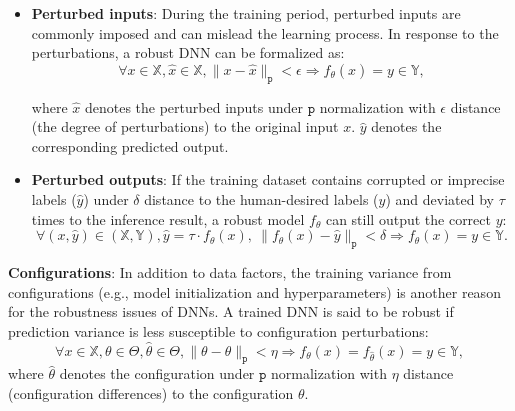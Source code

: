 \begin{itemize}[leftmargin=.2in] 

    \item \textbf{Perturbed inputs}: During the training period, perturbed inputs are commonly imposed and can mislead the learning process. In response to the perturbations, a robust DNN can be formalized as:
    \begin{equation}\label{eq1}
    \forall x\in \mathbb{X}, \hat{x}\in \mathbb{X}, \|x-\hat{x}\|_\mathtt{p} < \epsilon \Rightarrow {f_{\theta}(\hat{x})}=y\in \mathbb{Y},
    \end{equation}

where $\hat{x}$ denotes the perturbed inputs under $\mathtt{p}$ normalization with $\epsilon$ distance (the degree of perturbations) to the original input $x$. $\hat{y}$ denotes the corresponding predicted output. 


    \item \textbf{Perturbed outputs}: If the training dataset contains corrupted or imprecise labels ($\hat{y}$) under $\delta$ distance to the human-desired labels ($y$) and deviated by $\tau$ times to the inference result, a robust model $f_{\theta}$ can still output the correct $y$:
    \begin{equation} \label{eq3} 
    \forall (x, \hat{y})\in( \mathbb{X}, \mathbb{Y}), \hat{y} = \tau \cdot f_{\theta}(x), \  \|f_{\theta}(x)-\hat{y}\|_\mathtt{p} < \delta  \Rightarrow f_{\theta}(x) = y\in \mathbb{Y}.
    \end{equation}
\end{itemize}

\item{\textbf{Configurations}:} In addition to data factors, the training variance from configurations (e.g., model initialization and hyperparameters) is another reason for the robustness issues of DNNs. A trained DNN is said to be robust if prediction variance is less susceptible to configuration perturbations:
    \begin{equation}\label{eq4}  
   \forall  x\in \mathbb{X}, \theta \in \Theta, \hat{\theta} \in \Theta, \|\theta-\hat{\theta}\|_\mathtt{p} < \eta \Rightarrow f_{\theta}(x)=f_{\hat{\theta}}(x)=y\in \mathbb{Y},
    \end{equation}
where $\hat{\theta}$ denotes the configuration under $\mathtt{p}$ normalization with $\eta$ distance (configuration differences) to the configuration $\theta$.


